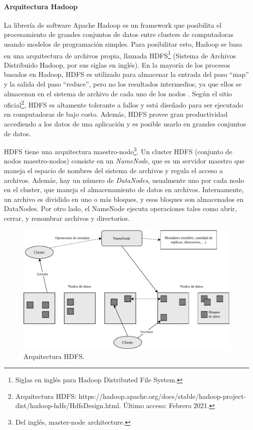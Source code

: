 \paragraph{Arquitectura Hadoop}
La librería de software Apache Hadoop es un framework que posibilita el procesamiento de grandes conjuntos de datos entre clusters de computadoras usando modelos de programación simples. Para posibilitar esto, Hadoop se basa en una arquitectura de archivos propia, llamada HDFS\footnote{Siglas en inglés para Hadoop Distributed File System.} (Sistema de Archivos Distribuido Hadoop, por sus siglas en inglés). En la mayoría de los procesos basados en Hadoop, HDFS es utilizado para almacenar la entrada del paso ``map'' y la salida del paso ``reduce'', pero no los resultados intermedios, ya que ellos se almacenan en el sistema de archivo de cada uno de los nodos \citep{condie2010mapreduce}. Según el sitio oficial\footnote{Arquitectura HDFS: https://hadoop.apache.org/docs/stable/hadoop-project-dist/hadoop-hdfs/HdfsDesign.html. Último acceso: Febrero 2021.}, HDFS es altamente tolerante a fallos y está diseñado para ser ejecutado en computadoras de bajo costo. Además, HDFS provee gran productividad accediendo a los datos de una aplicación y es posible usarlo en grandes conjuntos de datos.

\bigskip HDFS tiene una arquitectura maestro-nodo\footnote{Del inglés, master-node architecture.}. Un cluster HDFS (conjunto de nodos maestro-nodos) consiste en un \textit{NameNode}, que es un servidor maestro que maneja el espacio de nombres del sistema de archivos y regula el acceso a archivos. Además, hay un número de \textit{DataNodes}, usualmente uno por cada nodo en el cluster, que maneja el almacenamiento de datos en archivos. Internamente, un archivo es dividido en uno o más bloques, y esos bloques son almacenados en DataNodes. Por otro lado, el NameNode ejecuta operaciones tales como abrir, cerrar, y renombrar archivos y directorios.
\bigskip
\begin{figure}[h!]
	\centering
	\includegraphics[width=0.9\linewidth]{7_marco_teorico/imagenes/arquitectura_hdfs}
	\caption{Arquitectura HDFS.}
	\label{fig:arquitectura_hdfs}
\end{figure}

